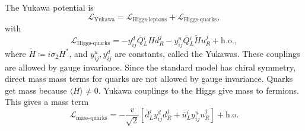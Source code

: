 The Yukawa potential is
\begin{equation}
  \mathscr{L}_{\text{Yukawa}} = \mathscr{L}_{\text{Higgs-leptons}} + \mathscr{L}_{\text{Higgs-quarks}},
\end{equation}
with
\begin{equation}
  \mathscr{L}_{\text{Higgs-quarks}} = - y^{d}_{ij} \overline{Q}{}^{i}_{L} H d_{R}^{j} - y^{u}_{ij} \overline{Q}{}^{i}_{L} \widetilde{H} u^{j}_{R} + \text{h.o.},
\end{equation}
where $\widetilde{H} \coloneqq i \sigma_2 H^*$, and $y^{u}_{ij}, y^{d}_{ij}$ are constants, called the Yukawas.
These couplings are allowed by gauge invariance.
Since the standard model has chiral symmetry, direct mass mass terms for quarks are not allowed by gauge invariance. Quarks get mass because $\langle H \rangle \neq 0$. Yukawa couplings to the Higgs give mass to fermions.
This gives a mass term
\begin{equation}
  \mathscr{L}_{\text{mass-quarks}} = -\frac{v}{\sqrt{2}} \left[ \overline{d}{}^{i}_{L} y^{d}_{ij} d^{j}_{R} + \overline{u}{}^{i}_{L} y^{u}_{ij} u^{j}_{R} \right] + \text{h.o.}
\end{equation}

